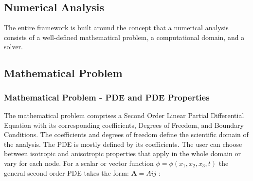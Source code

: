 \documentclass{article}
\begin{document}
	\newpage
	
	\subsection {Numerical Analysis}
	
	The entire framework is built around the concept that a numerical analysis consists of a well-defined mathematical problem, a computational domain, and a solver.

	\subsection{Mathematical Problem}
	
	\subsubsection{Mathematical Problem - PDE and PDE Properties}
	The mathematical problem comprises a Second Order Linear Partial Differential Equation with its corresponding coefficients, Degrees of Freedom, and Boundary Conditions. The coefficients and degrees of freedom define the scientific domain of the analysis. The PDE is mostly defined by its coefficients. The user can choose between isotropic and anisotropic properties that apply in the whole domain or vary for each node. For a scalar or vector function $\phi = \phi(x_1, x_2, x_3,t)$ the general second order PDE takes the form:	$\boldsymbol{A} = Aij$ : 
	
	
	
\end{document}
